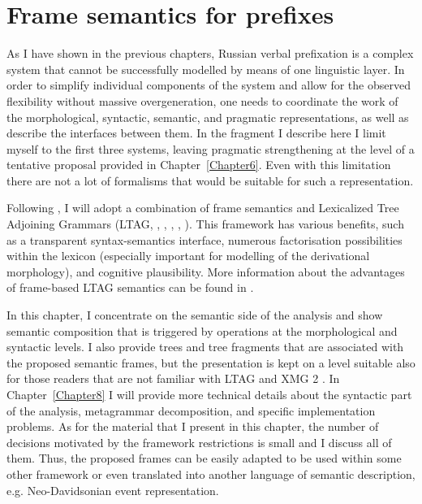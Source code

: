 
\chapter{Frame semantics for prefixes} %
\label{Chapter7}

As I have shown in the previous chapters, Russian verbal prefixation is a complex system that cannot be successfully modelled by means of one linguistic layer. In order to simplify individual components of the system and allow for the observed flexibility without massive overgeneration, one needs to coordinate the work of the morphological, syntactic, semantic, and pragmatic representations, as well as describe the interfaces between them. In the fragment I describe here I limit myself to the first three systems, leaving pragmatic strengthening at the level of a tentative proposal provided in Chapter~\ref{Chapter6}. Even with this limitation there are not a lot of formalisms that would be suitable for such a representation.

Following \citet{KallmeyerOsswald:12, KallmeyerOsswald:13}, I will adopt a combination of frame semantics \citep{Fillmore:82} and Lexicalized Tree Adjoining Grammars (LTAG, \citealt{JoshiSchabes:97}, \citealt{Frank:92}, \citealt{AbeilleRambow:00}, \citealt{Abeille:02}, \citealt{Frank:02}). This framework has various benefits, such as a transparent syntax-semantics interface, numerous factorisation possibilities within the lexicon (especially important for modelling of the derivational morphology), and cognitive plausibility. More information about the advantages of frame-based LTAG semantics can be found in \citet{KallmeyerOsswald:13}. 

In this chapter, I concentrate on the semantic side of the analysis and show semantic composition that is triggered by operations at the morphological and syntactic levels. I also provide trees and tree fragments that are associated with the proposed semantic frames, but the presentation is kept on a level suitable also for those readers that are not familiar with LTAG and XMG 2 \citep{Petitjean:16}. In Chapter~\ref{Chapter8} I will provide more technical details about the syntactic part of the analysis, metagrammar decomposition, and specific implementation problems. As for the material that I present in this chapter, the number of decisions motivated by the framework restrictions is small and I discuss all of them. Thus, the proposed frames can be easily adapted to be used within some other framework or even translated into another language of semantic description, e.g. Neo-Davidsonian event representation.

